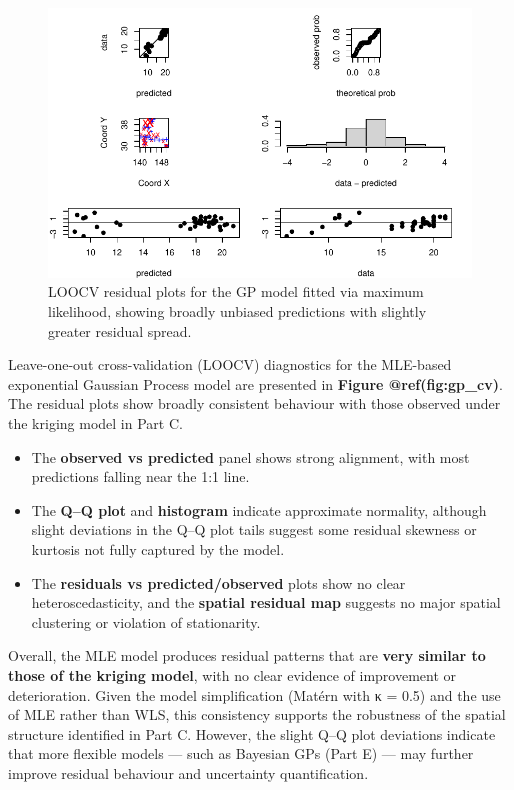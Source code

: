 \documentclass[
  11pt,
]{article}
\begin{document}
\begin{figure}[H]

{\centering \includegraphics{project_files/figure-pdf/fig-cvgp-1.pdf}

}

\caption{LOOCV residual plots for the GP model fitted via maximum
likelihood, showing broadly unbiased predictions with slightly greater
residual spread.}

\end{figure}%

Leave-one-out cross-validation (LOOCV) diagnostics for the MLE-based
exponential Gaussian Process model are presented in \textbf{Figure
@ref(fig:gp\_cv)}. The residual plots show broadly consistent behaviour
with those observed under the kriging model in Part C.

\begin{itemize}
\item
  The \textbf{observed vs predicted} panel shows strong alignment, with
  most predictions falling near the 1:1 line.
\item
  The \textbf{Q--Q plot} and \textbf{histogram} indicate approximate
  normality, although slight deviations in the Q--Q plot tails suggest
  some residual skewness or kurtosis not fully captured by the model.
\item
  The \textbf{residuals vs predicted/observed} plots show no clear
  heteroscedasticity, and the \textbf{spatial residual map} suggests no
  major spatial clustering or violation of stationarity.
\end{itemize}

Overall, the MLE model produces residual patterns that are \textbf{very
similar to those of the kriging model}, with no clear evidence of
improvement or deterioration. Given the model simplification (Matérn
with κ = 0.5) and the use of MLE rather than WLS, this consistency
supports the robustness of the spatial structure identified in Part C.
However, the slight Q--Q plot deviations indicate that more flexible
models --- such as Bayesian GPs (Part E) --- may further improve
residual behaviour and uncertainty quantification.
\end{document}
